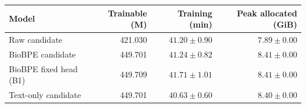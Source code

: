 \begin{tabular}{lrrr}
\toprule
Model & Trainable (M) & Training (min) & Peak allocated (GiB) \\
\midrule
Raw candidate & 421.030 & $41.20 \pm 0.90$ & $7.89 \pm 0.00$ \\
BioBPE candidate & 449.701 & $41.24 \pm 0.82$ & $8.41 \pm 0.00$ \\
BioBPE fixed head (B1) & 449.709 & $41.71 \pm 1.01$ & $8.41 \pm 0.00$ \\
Text-only candidate & 449.701 & $40.63 \pm 0.60$ & $8.40 \pm 0.00$ \\
\bottomrule
\end{tabular}
